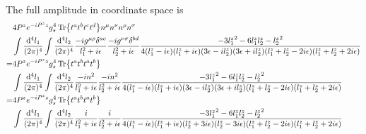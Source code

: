\documentclass{article}
\newcommand{\mm}[1]{\frac{\dd^4#1}{(2\pi)^4}}
\begin{document}
The full amplitude in coordinate space is
\begin{align}
	&\begin{aligned}[t]
		&4P^ze^{-iP^zz}g_s^4\Tr{t^at^bt^ct^d}n^{\mu}n^{\nu}n^{\rho}n^{\sigma}\\&\int\mm{l_1}\int\mm{l_2}\frac{-ig^{\mu\rho}\delta^{ac}}{l_1^2+i\epsilon}\frac{-ig^{\nu\sigma}\delta^{bd}}{l_2^2+i\epsilon}\frac{-3 {l_1^z}^2-6 {l_1^z} {l_2^z}-{l_2^z}^2}{4 ({l_1^z}-i \epsilon ) ({l_1^z}+i \epsilon ) (3 \epsilon -i {l_2^z}) (3 \epsilon +i {l_2^z}) ({l_1^z}+{l_2^z}-2 i \epsilon ) ({l_1^z}+{l_2^z}+2 i \epsilon )}
	\end{aligned}\\
	=&\begin{aligned}[t]
		&4P^ze^{-iP^zz}g_s^4\Tr{t^at^bt^at^b}\\&\int\mm{l_1}\int\mm{l_2}\frac{-in^2}{l_1^2+i\epsilon}\frac{-in^2}{l_2^2+i\epsilon}\frac{-3 {l_1^z}^2-6 {l_1^z} {l_2^z}-{l_2^z}^2}{4 ({l_1^z}-i \epsilon ) ({l_1^z}+i \epsilon ) (3 \epsilon -i {l_2^z}) (3 \epsilon +i {l_2^z}) ({l_1^z}+{l_2^z}-2 i \epsilon ) ({l_1^z}+{l_2^z}+2 i \epsilon )}
	\end{aligned}\\
	=&\begin{aligned}[t]
		&4P^ze^{-iP^zz}g_s^4\Tr{t^at^bt^at^b}\\&\int\mm{l_1}\int\mm{l_2}\frac{i}{l_1^2+i\epsilon}\frac{i}{l_2^2+i\epsilon}\frac{-3 {l_1^z}^2-6 {l_1^z} {l_2^z}-{l_2^z}^2}{4 ({l_1^z}-i \epsilon ) ({l_1^z}+i \epsilon ) (  {l_2^z}+3 i\epsilon) (  {l_2^z}-3 i\epsilon) ({l_1^z}+{l_2^z}-2 i \epsilon ) ({l_1^z}+{l_2^z}+2 i \epsilon )}
	\end{aligned}
\end{align}
\end{document}
